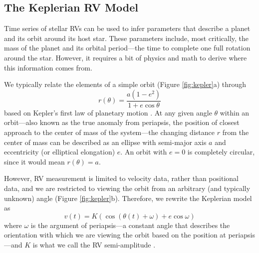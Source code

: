 \subsection{The Keplerian RV Model}

Time series of stellar RVs can be used to infer parameters that describe a planet and its orbit around its host star. These parameters include, most critically, the mass of the planet and its orbital period---the time to complete one full rotation around the star. However, it requires a bit of physics and math to derive where this information comes from.

We typically relate the elements of a simple orbit (Figure \ref{fig:kepler}a) through
\begin{equation}
    r(\theta) = \frac{a (1-e^2)}{1 + e \cos{\theta}}
    \label{eq:kepler}
\end{equation}
based on Kepler's first law of planetary motion \citep{kepler_astronomia_1609}. At any given angle $\theta$ within an orbit---also known as the true anomaly from periapsis, the position of closest approach to the center of mass of the system---the changing distance $r$ from the center of mass can be described as an ellipse with semi-major axis $a$ and eccentricity (or elliptical elongation) $e$. An orbit with $e=0$ is completely circular, since it would mean $r(\theta)=a$.

However, RV measurement is limited to velocity data, rather than positional data, and we are restricted to viewing the orbit from an arbitrary (and typically unknown) angle (Figure \ref{fig:kepler}b). Therefore, we rewrite the Keplerian model as
\begin{equation}
    v(t) = K (\cos{(\theta(t)+\omega)} + e \cos{\omega})
    \label{eq:kepler-rv}
\end{equation}
where $\omega$ is the argument of periapsis---a constant angle that describes the orientation with which we are viewing the orbit based on the position at periapsis---and $K$ is what we call the RV semi-amplitude \citep{lovis_radial_2011}.


